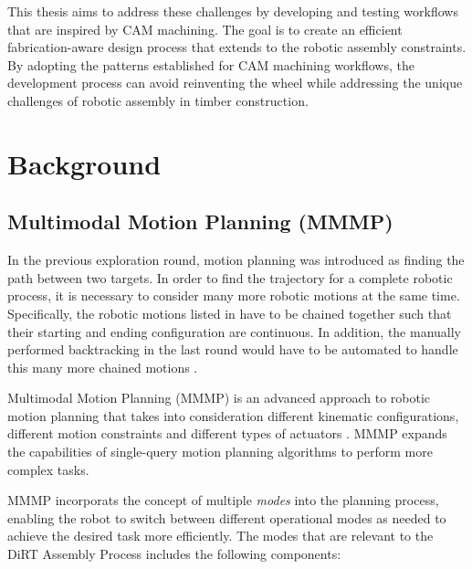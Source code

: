 This thesis aims to address these challenges by developing and testing workflows that are inspired by CAM machining. The goal is to create an efficient fabrication-aware design process that extends to the robotic assembly constraints. By adopting the patterns established for CAM machining workflows, the development process can avoid reinventing the wheel while addressing the unique challenges of robotic assembly in timber construction.

\vspace{2\baselineskip}

\FloatBarrier

\section{Background}
\label{section:exploration-3-background}

\subsection{Multimodal Motion Planning (MMMP)}
\label{subsection:exploration-3-multimodal-motion-planning-mmmp}

In the previous exploration round, motion planning was introduced as finding the path between two targets. In order to find the trajectory for a complete robotic process, it is necessary to consider many more robotic motions at the same time. Specifically, the robotic motions listed in  have to be chained together such that their starting and ending configuration are continuous. In addition, the manually performed backtracking in the last round would have to be automated to handle this many more chained motions .

Multimodal Motion Planning (MMMP) is an advanced approach to robotic motion planning that takes into consideration different kinematic configurations, different motion constraints and different types of actuators \parencite{hauserMultimodalMotionPlanning2010, hauserRandomizedMultimodalMotion2011}. MMMP expands the capabilities of single-query motion planning algorithms  to perform more complex tasks.

MMMP incorporats the concept of multiple \textit{modes} into the planning process, enabling the robot to switch between different operational modes as needed to achieve the desired task more efficiently. The modes that are relevant to the DiRT Assembly Process includes the following components:

